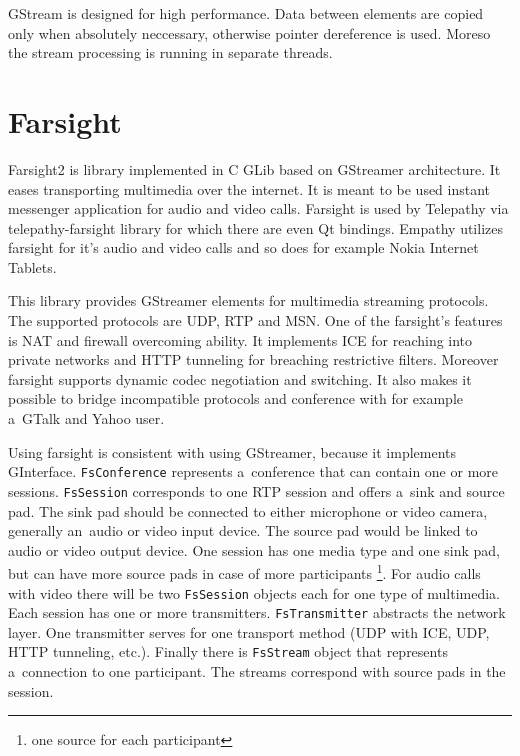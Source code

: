 GStream is designed for high performance. Data between elements are copied only when absolutely neccessary, otherwise pointer dereference is used. Moreso the stream processing is running in separate threads.  

\section{Farsight}
Farsight2 \cite{farsight} is library implemented in C GLib based on GStreamer architecture. It eases transporting multimedia over the internet. It is meant to be used instant messenger application for audio and video calls. Farsight is used by Telepathy via telepathy-farsight library for which there are even Qt bindings. Empathy utilizes farsight for it's audio and video calls and so does for example Nokia Internet Tablets.

This library provides GStreamer elements for multimedia streaming protocols. The supported protocols are UDP, RTP and MSN. One of the farsight's features is NAT and firewall overcoming ability. It implements ICE for reaching into private networks and HTTP tunneling for breaching restrictive filters. Moreover farsight supports dynamic codec negotiation and switching. It also makes it possible to bridge incompatible protocols and conference with for example a~GTalk and Yahoo user. 

Using farsight is consistent with using GStreamer, because it implements GInterface. \verb|FsConference| represents a~conference that can contain one or more sessions. \verb|FsSession| corresponds to one RTP session and offers a~sink and source pad. The sink pad should be connected to either microphone or video camera, generally an~audio or video input device. The source pad would be linked to audio or video output device. One session has one media type and one sink pad, but can have more source pads in case of more participants \footnote{one source for each participant}. For audio calls with video there will be two \verb|FsSession| objects each for one type of multimedia. Each session has one or more transmitters. \verb|FsTransmitter| abstracts the network layer. One transmitter serves for one transport method (UDP with ICE, UDP, HTTP tunneling, etc.). Finally there is \verb|FsStream| object that represents a~connection to one participant. The streams correspond with source pads in the session.

